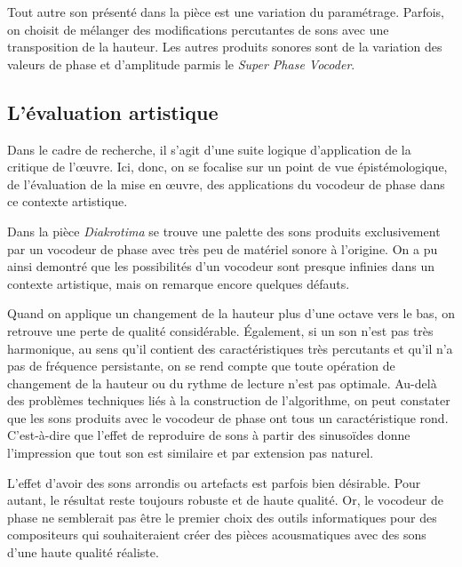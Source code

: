 Tout autre son présenté dans la pièce est une variation du paramétrage. Parfois, on choisit de mélanger des modifications percutantes de sons avec une transposition de la hauteur. Les autres produits sonores sont de la variation des valeurs de phase et d'amplitude parmis le \textit{Super Phase Vocoder}. 

\subsection{L'évaluation artistique}

Dans le cadre de recherche, il s'agit d'une suite logique d'application de la critique de l'œuvre. Ici, donc, on se focalise sur un point de vue épistémologique, de l'évaluation de la mise en œuvre, des applications du vocodeur de phase dans ce contexte artistique. 

Dans la pièce \textit{Diakrotima} se trouve une palette des sons produits exclusivement par un vocodeur de phase avec très peu de matériel sonore à l'origine. On a pu ainsi demontré que les possibilités d'un vocodeur sont presque infinies dans un contexte artistique, mais on remarque encore quelques défauts. 

Quand on applique un changement de la hauteur plus d'une octave vers le bas, on retrouve une perte de qualité considérable. Également, si un son n'est pas très harmonique, au sens qu'il contient des caractéristiques très percutants et qu'il n'a pas de fréquence persistante, on se rend compte que toute opération de changement de la hauteur ou du rythme de lecture n'est pas optimale. Au-delà des problèmes techniques liés à la construction de l'algorithme, on peut constater que les sons produits avec le vocodeur de phase ont tous un caractéristique rond. C'est-à-dire que l'effet de reproduire de sons à partir des sinusoïdes donne l'impression que tout son est similaire et par extension pas naturel. 

L'effet d'avoir des sons arrondis ou artefacts est parfois bien désirable. Pour autant, le résultat reste toujours robuste et de haute qualité. Or, le vocodeur de phase ne semblerait pas être le premier choix des outils informatiques pour des compositeurs qui souhaiteraient créer des pièces acousmatiques avec des sons d'une haute qualité réaliste.
